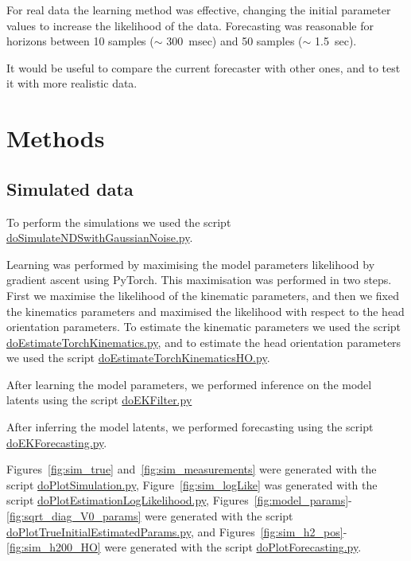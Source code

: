 \documentclass[12pt]{article}
\begin{document}
For real data the learning method was effective, changing the initial parameter
values to increase the likelihood of the data.
%
Forecasting was reasonable for horizons between 10 samples ($\sim$ 300~msec) and 50
samples ($\sim$ 1.5~sec).

It would be useful to compare the current forecaster with other ones, and to
test it with more realistic data.

\section{Methods}

\subsection{Simulated data}

To perform the simulations we used the script
\href{https://github.com/joacorapela/lds_simulations/blob/master/code/scripts/doSimulateNDSwithGaussianNoise.py}{doSimulateNDSwithGaussianNoise.py}.

Learning was performed by maximising the model parameters likelihood by
gradient ascent using PyTorch. This maximisation was performed in two steps. First we
maximise the likelihood of the kinematic parameters, and then we fixed the
kinematics parameters and maximised the likelihood with respect to the head
orientation parameters. To estimate the kinematic parameters we used the script
\href{https://github.com/joacorapela/lds_simulations/blob/master/code/scripts/doEstimateTorchKinematics.py}{doEstimateTorchKinematics.py},
and to estimate the head orientation parameters we used the script
\href{https://github.com/joacorapela/lds_simulations/blob/master/code/scripts/doEstimateTorchKinematicsHO.py}{doEstimateTorchKinematicsHO.py}.

After learning the model parameters, we performed inference on the model latents
using the script
\href{https://github.com/joacorapela/lds_simulations/blob/master/code/scripts/doEKFilter.py}{doEKFilter.py}

After inferring the model latents, we performed forecasting using the script
\href{https://github.com/joacorapela/lds_simulations/blob/master/code/scripts/doEKForecasting.py}{doEKForecasting.py}.

Figures~\ref{fig:sim_true} and~\ref{fig:sim_measurements} were generated with
the script
\href{https://github.com/joacorapela/lds_simulations/blob/master/code/scripts/doPlotSimulation.py}{doPlotSimulation.py},
Figure~\ref{fig:sim_logLike} was generated with the script
    \href{https://github.com/joacorapela/lds_simulations/blob/master/code/scripts/doPlotEstimationLogLikelihood.py}{doPlotEstimationLogLikelihood.py},
    Figures~\ref{fig:model_params}-\ref{fig:sqrt_diag_V0_params} were generated
    with the script
    \href{https://github.com/joacorapela/lds_simulations/blob/master/code/scripts/doPlotTrueInitialEstimatedParams.py}{doPlotTrueInitialEstimatedParams.py},
and Figures~\ref{fig:sim_h2_pos}-\ref{fig:sim_h200_HO} were generated with the
script
\href{https://github.com/joacorapela/lds_simulations/blob/master/code/scripts/doPlotForecasting.py}{doPlotForecasting.py}.
\end{document}
